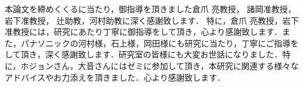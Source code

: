 \acknowledgment
本論文を締めくくるに当たり，御指導を頂きました倉爪 亮教授， 諸岡准教授， 岩下准教授， 辻助教，河村助教に深く感謝致します．
特に，倉爪 亮教授，岩下准教授には，研究にあたり丁寧に御指導をして頂き，心より感謝致します．また，パナソニックの河村様，石上様，岡田様にも研究に当たり，丁寧にご指導をして頂き，深く感謝致します．研究室の皆様にも大変お世話になりました．特に，ホジョンさん，大音さんにはゼミに参加して頂き，本研究に関連する様々なアドバイスやお力添えを頂きました．心より感謝致します．